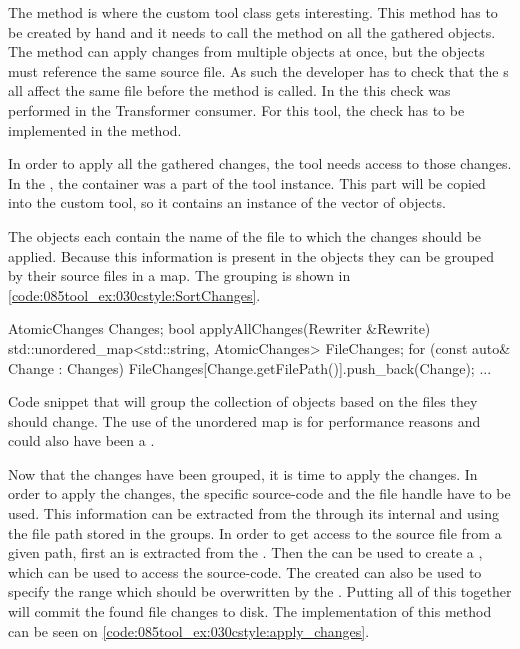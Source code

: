 The  method is where the custom tool class gets interesting. This method has to be created by hand and it needs to call the  method on all the gathered  objects. The  method can apply changes from multiple  objects at once, but the objects must reference the same source file.
As such the developer has to check that the s all affect the same file before the  method is called. 
In the  this check was performed in the Transformer consumer. 
For this tool, the check has to be implemented in the  method.

In order to apply all the gathered changes, the tool needs access to those changes. In the , the  container was a part of the tool instance. This part will be copied into the custom tool, so it contains an instance of the vector of  objects. 

The  objects each contain the name of the file to which the changes should be applied. Because this information is present in the objects they can be grouped by their source files in a map. The grouping is shown in \cref{code:085tool_ex:030cstyle:SortChanges}.

\begin{listing}[H]
    \begin{cppcode}
AtomicChanges Changes;
bool applyAllChanges(Rewriter &Rewrite) {
    std::unordered_map<std::string, AtomicChanges> FileChanges;
    for (const auto& Change : Changes) {
        FileChanges[Change.getFilePath()].push_back(Change);
    }
    ...
}
    \end{cppcode}
    \caption{Code snippet that will group the collection of  objects based on the files they should change. The use of the unordered map is for performance reasons and could also have been a .}
    \label{code:085tool_ex:030cstyle:SortChanges}
\end{listing}

Now that the changes have been grouped, it is time to apply the changes. In order to apply the changes, the specific source-code and the file handle have to be used. This information can be extracted from the  through its internal  and  using the file path stored in the groups. In order to get access to the source file from a given path, first an  is extracted from the . Then the  can be used to create a , which can be used to access the source-code. The created  can also be used to specify the range which should be overwritten by the . Putting all of this together will commit the found file changes to disk. The implementation of this method can be seen on \cref{code:085tool_ex:030cstyle:apply_changes}.

